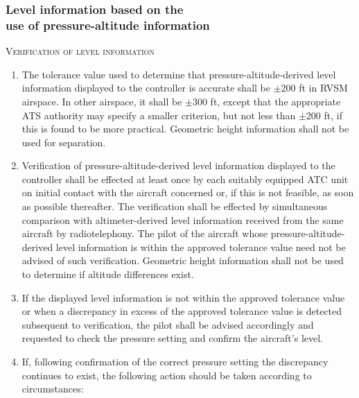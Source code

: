 \subsubsection[Level information based on the use of pressure-altitude information]{Level information based on the \\ use of pressure-altitude information}

\begin{enumeratesc}
    \item \textsc{Verification of level information}
    \begin{enumerate}
        \item The tolerance value used to determine that pressure-altitude-derived level information displayed to the controller is accurate shall be $\pm$200 ft in RVSM airspace. In other airspace, it shall be $\pm$300 ft, except that the appropriate ATS authority may specify a smaller criterion, but not less than $\pm$200 ft, if this is found to be more practical. Geometric height information shall not be used for separation.
        \item Verification of pressure-altitude-derived level information displayed to the controller shall be effected at least once by each suitably equipped ATC unit on initial contact with the aircraft concerned or, if this is not feasible, as soon as possible thereafter. The verification shall be effected by simultaneous comparison with altimeter-derived level information received from the same aircraft by radiotelephony. The pilot of the aircraft whose pressure-altitude-derived level information is within the approved tolerance value need not be advised of such verification. Geometric height information shall not be used to determine if altitude differences exist.
        \item If the displayed level information is not within the approved tolerance value or when a discrepancy in excess of the approved tolerance value is detected subsequent to verification, the pilot shall be advised accordingly and requested to check the pressure setting and confirm the aircraft's level.
        \item If, following confirmation of the correct pressure setting the discrepancy continues to exist, the following action should be taken according to circumstances:


\end{enumerate}
\end{enumeratesc}
